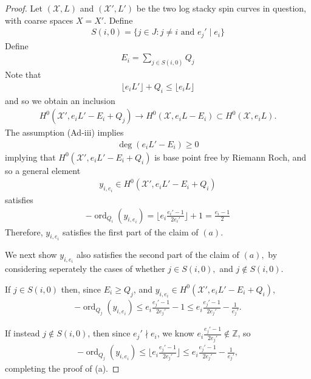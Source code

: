 \documentclass{amsart}
\theoremstyle{plain}
\theoremstyle{definition}
\theoremstyle{remark}
\numberwithin{equation}{section}
\newcommand\BZ{{\mathbb Z}}
\newcommand \sx{\mathscr X}
\DeclareMathOperator{\ord}{ord}
\newcommand \subhalf[1]{\frac{{#1} - 1}{2{#1}}}
\begin{document}
\begin{proof}
Let $(\sx,L)$ and $(\sx',L')$ be the two log stacky spin curves in question, with coarse spaces $X = X'$. Define
\begin{align*}
	S(i,0) = \{j \in J : j \neq i \text{ and }e_j' \mid e_i\}
\end{align*}
Define
\begin{align*}
	E_i = \sum_{j \in S(i,0)}^{}Q_j
\end{align*}
Note that
\begin{align*}
	\lfloor e_i L' \rfloor + Q_i \leq \lfloor e_i L \rfloor 
\end{align*}
and so we obtain an inclusion
\begin{align*}
	H^0(\sx',e_iL'-E_i + Q_j) \rightarrow H^0(\sx,e_iL - E_i) \subset H^0(\sx,e_iL).
\end{align*}
The assumption (Ad-iii) implies
\begin{align*}
	\deg \left( e_i L' - E_i \right) \geq 0
\end{align*}
implying that $H^0(\sx',e_iL'-E_i + Q_i)$ is base point free by Riemann Roch, and so a general element
\begin{align*}
	y_{i,e_i} \in H^0(\sx',e_iL'-E_i + Q_i)
\end{align*}
satisfies
\begin{align*}
	-\ord_{Q_i}(y_{i,e_i}) = \lfloor e_i \subhalf {e_i'} \rfloor +1 = \frac{e_i - 1}{2}
\end{align*}
Therefore, $y_{i,e_i}$ satisfies the first part of the claim of $(a)$.

We next show $y_{i,e_i}$ also satisfies the second part of the claim of $(a),$ by considering seperately the cases of whether $j \in S(i,0),$ and $j \notin S(i,0)$.

If $j \in S(i,0)$ then, since $E_i \geq Q_j$, and $y_{i,e_i} \in H^0(\sx',e_iL'-E_i + Q_i)$,
\begin{align*}
	-\ord_{Q_j}(y_{i,e_i}) \leq e_i\subhalf {e_j'} - 1 \leq e_i \subhalf{e_j'} - \frac{1}{e_j'}.
\end{align*}

If instead $j \notin S(i,0)$, then since $e_j' \nmid e_i$, we know $e_i\subhalf{e_j'} \notin \BZ$, so
\begin{align*}
	-\ord_{Q_j}(y_{i,e_i}) \leq \lfloor  e_i\subhalf{e_j'} \rfloor \leq e_i\subhalf{e_j'} - \frac{1}{e_j'},
\end{align*}
completing the proof of (a).


\end{proof}
\end{document}
